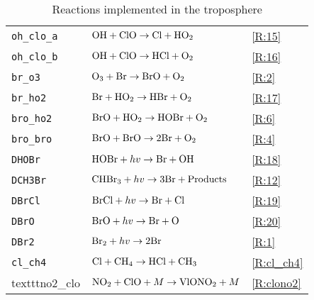 \begin{table}[ht]
{\begin{tabular}{|l|l|l|}
\texttt{oh\_clo\_a}              & $\mathrm{OH} + \mathrm{ClO} \rightarrow \mathrm{Cl} + \mathrm{HO_2}$                              & \ref{R:15} \\
\texttt{oh\_clo\_b}              & $\mathrm{OH} + \mathrm{ClO} \rightarrow \mathrm{HCl} + \mathrm{O_2}$                              & \ref{R:16} \\
\texttt{br\_o3}                  & $\mathrm{O_3} + \mathrm{Br} \rightarrow \mathrm{BrO} + \mathrm{O_2}$                              & \ref{R:2} \\
\texttt{br\_ho2}                 & $\mathrm{Br} + \mathrm{HO_2} \rightarrow \mathrm{HBr} + \mathrm{O_2}$                             & \ref{R:17} \\
\texttt{bro\_ho2}                & $\mathrm{BrO} + \mathrm{HO_2} \rightarrow \mathrm{HOBr} + \mathrm{O_2}$                                    & \ref{R:6} \\
\texttt{bro\_bro}                & $\mathrm{BrO} + \mathrm{BrO} \rightarrow 2\mathrm{Br} + \mathrm{O_2}$                             & \ref{R:4} \\
\texttt{DHOBr}                   & $\mathrm{HOBr} + hv \rightarrow \mathrm{Br} + \mathrm{OH}$                                      & \ref{R:18} \\
\texttt{DCH3Br}                  & $\mathrm{CHBr_3} + hv \rightarrow 3\mathrm{Br} + \mathrm{Products}$                             & \ref{R:12} \\
\texttt{DBrCl}                   & $\mathrm{BrCl} + hv \rightarrow \mathrm{Br} + \mathrm{Cl}$                                      & \ref{R:19} \\
\texttt{DBrO}                    & $\mathrm{BrO} + hv \rightarrow \mathrm{Br} + \mathrm{O}$                                        & \ref{R:20} \\
\texttt{DBr2}                    & $\mathrm{Br_2} + hv \rightarrow 2\mathrm{Br} $                                                & \ref{R:1} \\
\texttt{cl\_ch4}                    & $\mathrm{Cl} + \mathrm{CH_4} \rightarrow \mathrm{HCl} + \mathrm{CH_3} $                                                & \ref{R:cl_ch4} \\
texttt{no2\_clo}                    & $\mathrm{NO_2} + \mathrm{ClO} + M \rightarrow \mathrm{VlONO_2} + M $                                                & \ref{R:clono2} \\
\hline
\end{tabular}
}
\caption{Reactions implemented in the troposphere}
\label{tab:3}
\end{table}